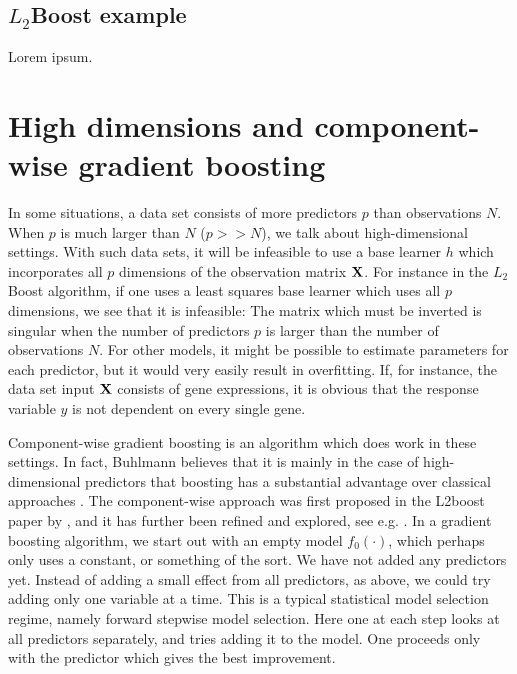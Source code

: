 \subsection{$L_2$Boost example}
Lorem ipsum.

\section{High dimensions and component-wise gradient boosting}
In some situations, a data set consists of more predictors $p$ than observations $N$. When $p$ is much larger than $N$ ($p>>N$), we talk about high-dimensional settings. With such data sets, it will be infeasible to use a base learner $h$ which incorporates all $p$ dimensions of the observation matrix $\mathbf{X}$.
For instance in the $L_2$Boost algorithm, if one uses a least squares base learner which uses all $p$ dimensions, we see that it is infeasible: The matrix which must be inverted is singular when the number of predictors $p$ is larger than the number of observations $N$. For other models, it might be possible to estimate parameters for each predictor, but it would very easily result in overfitting. If, for instance, the data set input $\mathbf{X}$ consists of gene expressions, it is obvious that the response variable $y$ is not dependent on every single gene.

Component-wise gradient boosting is an algorithm which does work in these settings. In fact, Buhlmann believes that it is mainly in the case of high-dimensional predictors that boosting has a substantial advantage over classical approaches \citep{buhlmann2006}.
The component-wise approach was first proposed in the L2boost paper by \citet{buhlmann-yu}, and it has further been refined and explored, see e.g. \citet{buhlmann2006}.
In a gradient boosting algorithm, we start out with an empty model $f_0(\cdot)$, which perhaps only uses a constant, or something of the sort. We have not added any predictors yet. Instead of adding a small effect from all predictors, as above, we could try adding only one variable at a time. This is a typical statistical model selection regime, namely forward stepwise model selection. Here one at each step looks at all predictors separately, and tries adding it to the model. One proceeds only with the predictor which gives the best improvement.


